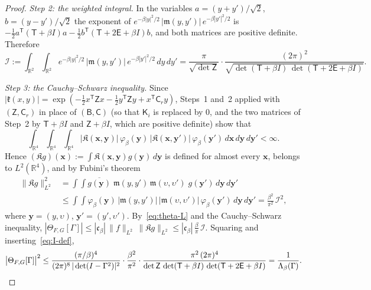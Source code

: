 \documentclass[11pt,reqno]{amsart}
\theoremstyle{definition}
\numberwithin{equation}{section}
\newcommand{\R}{\mathbb{R}}
\newcommand{\sB}{\mathsf{B}}
\newcommand{\sC}{\mathsf{C}}
\newcommand{\sZ}{\mathsf{Z}}
\newcommand{\sT}{\mathsf{T}}
\newcommand{\sE}{\mathsf{E}}
\newcommand{\sK}{\mathsf{K}}
\begin{document}
\begin{proof}
\emph{Step 2: the weighted integral.} In the variables $a=(y+y')/\sqrt2$, $b=(y-y')/\sqrt2$ the exponent of $e^{-\beta|y|^2/2}\,|\mathfrak{m}(y,y')|\,e^{-\beta|y'|^2/2}$ is $-\frac12a^{\mathsf{T}}(\sT+\beta I)a-\frac12b^{\mathsf{T}}(\sT+2\sE+\beta I)b$, and both matrices are positive definite. Therefore
\begin{equation}\label{eq:I-def}
  \mathcal{I}:=\int_{\R^2}\!\int_{\R^2}e^{-\beta|y|^2/2}\,|\mathfrak{m}(y,y')|\,e^{-\beta|y'|^2/2}\,dy\,dy'=\frac{\pi}{\sqrt{\det\sZ}}\cdot\frac{(2\pi)^2}{\sqrt{\det(\sT+\beta I)\,\det(\sT+2\sE+\beta I)}} .
\end{equation}

\emph{Step 3: the Cauchy--Schwarz inequality.} Since $|\mathfrak{k}(x,y)|=\exp(-\frac12x^{\mathsf{T}}\sZ x-\frac12y^{\mathsf{T}}\sZ y+x^{\mathsf{T}}\sC_ry)$, Steps~1 and~2 applied with $(\sZ,\sC_r)$ in place of $(\sB,\sC)$ (so that $\sK_i$ is replaced by $0$, and the two matrices of Step~2 by $\sT+\beta I$ and $\sZ+\beta I$, which are positive definite) show that
\[
  \int_{\R^4}\!\int_{\R^4}\!\int_{\R^4}|\mathfrak{K}(\mathbf{x},\mathbf{y})|\,\varphi_\beta(\mathbf{y})\,|\mathfrak{K}(\mathbf{x},\mathbf{y}')|\,\varphi_\beta(\mathbf{y}')\,d\mathbf{x}\,d\mathbf{y}\,d\mathbf{y}'<\infty .
\]
Hence $(\mathfrak{K}g)(\mathbf{x}):=\int \mathfrak{K}(\mathbf{x},\mathbf{y})g(\mathbf{y})\,d\mathbf{y}$ is defined for almost every $\mathbf{x}$, belongs to $L^2(\R^4)$, and by Fubini's theorem
\begin{align*}
  \|\mathfrak{K}g\|_{L^2}^2&=\int\!\!\int\overline{g(\mathbf{y})}\;\mathfrak{m}(y,y')\,\mathfrak{m}(\upsilon,\upsilon')\;g(\mathbf{y}')\,d\mathbf{y}\,d\mathbf{y}'\\
  &\le\int\!\!\int\varphi_\beta(\mathbf{y})\,|\mathfrak{m}(y,y')|\,|\mathfrak{m}(\upsilon,\upsilon')|\,\varphi_\beta(\mathbf{y}')\,d\mathbf{y}\,d\mathbf{y}'=\frac{\beta^2}{\pi^2}\,\mathcal{I}^2 ,
\end{align*}
where $\mathbf{y}=(y,\upsilon)$, $\mathbf{y}'=(y',\upsilon')$. By~\eqref{eq:theta-L} and the Cauchy--Schwarz inequality, $|\Theta_{F,G}[\Gamma]|\le|\mathfrak{c}_\beta|\,\|f\|_{L^2}\,\|\mathfrak{K}g\|_{L^2}\le|\mathfrak{c}_\beta|\,\frac\beta\pi\,\mathcal{I}$. Squaring and inserting~\eqref{eq:I-def},
\[
  \bigl|\Theta_{F,G}[\Gamma]\bigr|^2\le\frac{(\pi/\beta)^4}{(2\pi)^8\,|\det(I-\Gamma^2)|^2}\cdot\frac{\beta^2}{\pi^2}\cdot\frac{\pi^2\,(2\pi)^4}{\det\sZ\,\det(\sT+\beta I)\,\det(\sT+2\sE+\beta I)}=\frac1{\Lambda_\beta(\Gamma)} . \qedhere
\]
\end{proof}
\end{document}
